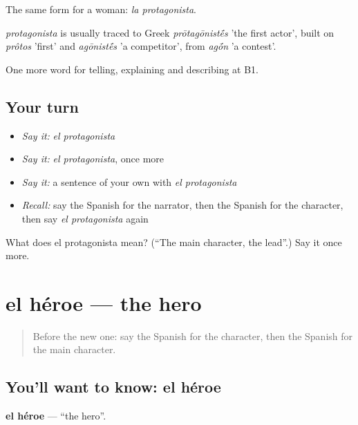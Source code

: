 The same form for a woman: \emph{la protagonista}.

\begin{cousinweb}
\emph{protagonista} is usually traced to Greek \emph{prōtagōnist\'{\={e}}s} 'the first actor', built on \emph{prôtos} 'first' and \emph{agōnist\'{\={e}}s} 'a competitor', from \emph{ag\'{\={o}}n} 'a contest'.
\end{cousinweb}

\begin{grammarlens}[title={What you've built}]
One more word for telling, explaining and describing at B1.
\end{grammarlens}

\subsection*{Your turn}
\begin{itemize}
\raggedright
  \item \emph{Say it:} \emph{el protagonista}
  \item \emph{Say it:} \emph{el protagonista}, once more
  \item \emph{Say it:} a sentence of your own with \emph{el protagonista}
  \item \emph{Recall:} say the Spanish for the narrator, then the Spanish for the character, then say \emph{el protagonista} again
\end{itemize}

\begin{tcolorbox}[breakable,colback=teal!4,colframe=teal!35!black,title={Before you move on}]
What does el protagonista mean? (\textquotedblleft{}The main character, the lead\textquotedblright{}.) Say it once more.
\end{tcolorbox}
\section[el héroe]{el héroe — the hero}

\label{lesson:ES-C564-heroe}



\begin{quote}
Before the new one: say the Spanish for the character, then the Spanish for the main character.
\end{quote}

\subsection*{You'll want to know: el héroe}
\textbf{el héroe} — \textquotedblleft{}the hero\textquotedblright{}.

